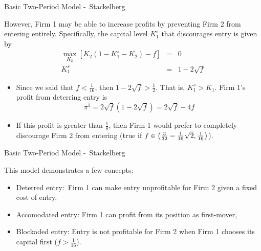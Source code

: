 \begin{frame}{Basic Two-Period Model -\ Stackelberg}


However, Firm 1 may be able to increase profits by preventing Firm 2 from
entering entirely. Specifically, the capital level $K_{1}^{s}$ that
discourages entry is given by%
\begin{eqnarray*}
\max_{K_{2}}\left[ K_{2}\left( 1-K_{1}^{s}-K_{2}\right) -f\right]  &=&0 \\
K_{1}^{s} &=&1-2\sqrt{f}
\end{eqnarray*}

\begin{itemize}
\item Since we said that $f<\frac{1}{16}$, then $1-2\sqrt{f}>\frac{1}{2}$.
That is, $K_{1}^{s}>K_{1}$. Firm 1's profit from deterring entry is%
\[
\pi ^{1}=2\sqrt{f}\left( 1-2\sqrt{f}\right) =2\sqrt{f}-4f
\]

\item If this profit is greater than $\frac{1}{8}$, then Firm 1 would prefer
to completely discourage Firm 2 from entering (true if $f\in \left( \frac{3}{%
32}-\frac{1}{16}\sqrt{2},\frac{1}{16}\right) $).
\end{itemize}

\end{frame}%

\begin{frame}{Basic Two-Period Model -\ Stackelberg}

This model demonstrates a few concepts:

\begin{itemize}
\item Deterred entry:\ Firm 1 can make entry unprofitable for Firm 2 given a
fixed cost of entry,

\item Accomodated entry: Firm 1 can profit from its position as first-mover,

\item Blockaded entry: Entry is not profitable for Firm 2 when Firm 1
chooses its capital first ($f>\frac{1}{16}$).
\end{itemize}

\end{frame}%

